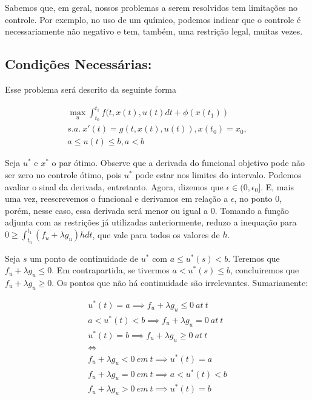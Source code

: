 Sabemos que, em geral, nossos problemas a serem resolvidos tem limitações no controle. Por exemplo, no uso de um químico, podemos indicar que o controle é necessariamente não negativo e tem, também, uma restrição legal, muitas vezes. 

\subsection{Condições Necessárias:} Esse problema será descrito da seguinte forma

\begin{align*}
    \max_u \int_{t_0}^{t_1} f(t,x(t),u(t)dt + \phi(x(t_1)) \\
    s.a.~x'(t) = g(t,x(t),u(t)), x(t_0) = x_0, \\
    a \leq u(t) \leq b, a < b
\end{align*}

Seja $u^*$ e $x^*$ o par ótimo. Observe que a derivada do funcional objetivo pode não ser zero no controle ótimo, pois $u^*$ pode estar nos limites do intervalo. Podemos avaliar o sinal da derivada, entretanto. Agora, dizemos que $\epsilon \in (0,\epsilon _0]$.  E, mais uma vez, reescrevemos o funcional e derivamos em relação a $\epsilon$, no ponto $0$, porém, nesse caso, essa derivada será menor ou igual a $0$. Tomando a função adjunta com as restrições já utilizadas anteriormente, reduzo a inequação para $0 \geq \int_{t_0}^{t_1} (f_u + \lambda g_u)h dt$, que vale para todos os valores de $h$. 

Seja $s$ um ponto de continuidade de $u^*$ com $a \leq u^*(s) < b$. Teremos que $f_u + \lambda g_u \leq 0$. Em contrapartida, se tivermos $a < u^*(s) \leq b$, concluiremos que $f_u + \lambda g_u \geq 0$. Os pontos que não há continuidade são irrelevantes. Sumariamente:

\begin{align*}
    u^*(t) = a \implies  f_u + \lambda g_u \leq 0 ~at~ t \\
    a < u^*(t) < b \implies f_u + \lambda g_u = 0 ~at~ t \\
    u^*(t) = b \implies f_u + \lambda g_u \geq 0 ~at~ t \\ 
    \iff \\
    f_u + \lambda g_u < 0 ~em~ t \implies u^*(t) = a \\
    f_u + \lambda g_u = 0 ~em~ t \implies a < u^*(t) < b \\
    f_u + \lambda g_u > 0 ~em~ t \implies u^*(t) = b \\
\end{align*}